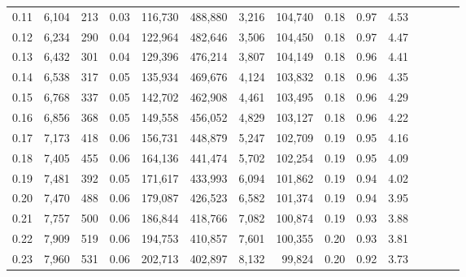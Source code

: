 \begin{tabular}{rrrcrrrrrrrrrrr}
0.11 &   6,104 &     213 &                                       0.03 &  116,730 &  488,880 &    3,216 &  104,740 &  0.18 &  0.97 &                         4.53 \\
0.12 &   6,234 &     290 &                                       0.04 &  122,964 &  482,646 &    3,506 &  104,450 &  0.18 &  0.97 &                         4.47 \\
0.13 &   6,432 &     301 &                                       0.04 &  129,396 &  476,214 &    3,807 &  104,149 &  0.18 &  0.96 &                         4.41 \\
0.14 &   6,538 &     317 &                                       0.05 &  135,934 &  469,676 &    4,124 &  103,832 &  0.18 &  0.96 &                         4.35 \\
0.15 &   6,768 &     337 &                                       0.05 &  142,702 &  462,908 &    4,461 &  103,495 &  0.18 &  0.96 &                         4.29 \\
0.16 &   6,856 &     368 &                                       0.05 &  149,558 &  456,052 &    4,829 &  103,127 &  0.18 &  0.96 &                         4.22 \\
0.17 &   7,173 &     418 &                                       0.06 &  156,731 &  448,879 &    5,247 &  102,709 &  0.19 &  0.95 &                         4.16 \\
0.18 &   7,405 &     455 &                                       0.06 &  164,136 &  441,474 &    5,702 &  102,254 &  0.19 &  0.95 &                         4.09 \\
0.19 &   7,481 &     392 &                                       0.05 &  171,617 &  433,993 &    6,094 &  101,862 &  0.19 &  0.94 &                         4.02 \\
0.20 &   7,470 &     488 &                                       0.06 &  179,087 &  426,523 &    6,582 &  101,374 &  0.19 &  0.94 &                         3.95 \\
0.21 &   7,757 &     500 &                                       0.06 &  186,844 &  418,766 &    7,082 &  100,874 &  0.19 &  0.93 &                         3.88 \\
0.22 &   7,909 &     519 &                                       0.06 &  194,753 &  410,857 &    7,601 &  100,355 &  0.20 &  0.93 &                         3.81 \\
0.23 &   7,960 &     531 &                                       0.06 &  202,713 &  402,897 &    8,132 &   99,824 &  0.20 &  0.92 &                         3.73 \\

\end{tabular}
